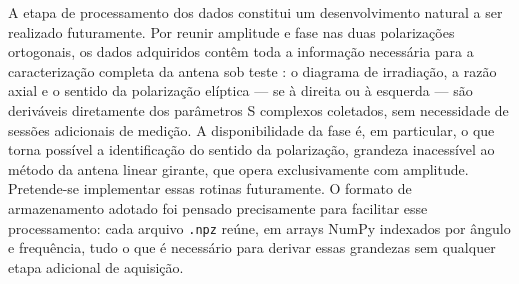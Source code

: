 \documentclass[12pt, a4paper]{article}
\begin{document}
A etapa de processamento dos dados constitui um desenvolvimento natural a ser realizado futuramente. Por reunir amplitude e fase nas duas polarizações ortogonais, os dados adquiridos contêm toda a informação necessária para a caracterização completa da antena sob teste \citep{ieee149_2021}: o diagrama de irradiação, a razão axial e o sentido da polarização elíptica --- se à direita ou à esquerda --- são deriváveis diretamente dos parâmetros S complexos coletados, sem necessidade de sessões adicionais de medição. A disponibilidade da fase é, em particular, o que torna possível a identificação do sentido da polarização, grandeza inacessível ao método da antena linear girante, que opera exclusivamente com amplitude. Pretende-se implementar essas rotinas futuramente. O formato de armazenamento adotado foi pensado precisamente para facilitar esse processamento: cada arquivo \texttt{.npz} reúne, em arrays NumPy indexados por ângulo e frequência, tudo o que é necessário para derivar essas grandezas sem qualquer etapa adicional de aquisição.






\end{document}
